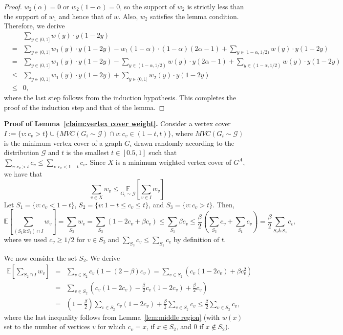 \documentclass[11pt]{article}
\newcommand{\E}[0]{\ensuremath{\mathbb{E}}}
\begin{document}
\begin{proof}
$w_2(\alpha) = 0$ or $w_2(1 - \alpha) = 0$, so the support of $w_2$ is
strictly less than the support of $w_1$ and hence that of $w$.
Also, $w_2$ satisfies the lemma condition.  Therefore,
we derive
\begin{eqnarray*}    
 & &  \sum_{y \in (0,1]} w(y) \cdot y (1 - 2y)\\
 & = & \sum_{y \in (0,1]} w_1(y) \cdot y (1 - 2y) -
  w_1(1-\alpha) \cdot (1 - \alpha) (2\alpha -1) + 
  \sum_{y \in [1-\alpha,1/2)} w(y) \cdot y (1 - 2y)\\ 
  & = & \sum_{y \in (0,1]} w_1(y) \cdot y (1 - 2y) -
  \sum_{y \in (1-\alpha,1/2)} w(y) \cdot y (2\alpha -1) + 
  \sum_{y \in (1-\alpha,1/2)} w(y) \cdot y (1 - 2y)\\ 
  & \le & \sum_{y \in (0,1]} w_1(y) \cdot y (1 - 2y)
   + \sum_{y \in (0,1]} w_2(y) \cdot y (1 - 2y)\\
   & \le & 0,
\end{eqnarray*}
where the last step follows from the induction hypothesis.  This
completes the proof of the induction step and that of the lemma.
\end{proof} 

\noindent\textbf{Proof of Lemma~\ref{claim:vertex cover weight}.}
Consider a vertex cover $I := \{ v : c_v > t \} \cup \{MVC(G_i \sim \mathcal{G}) \cap v :
    c_v \in (1-t , t) \}$, where $MVC(G_i \sim \mathcal{G})$ is the
    minimum vertex cover of a graph $G_i$ drawn randomly according to the distribution
    $\mathcal{G}$ and $t$ is the smallest $t \in [0.5, 1]$ such that
    $\sum_{v : c_v > t} c_v \leq \sum_{v: c_v < 1-t} c_v.$
    Since $X$ is a minimum weighted vertex cover of $G^A$, we have that 
    \[\sum_{v \in X} w_v \leq \underset{G_i \sim \mathcal{G}}{\E}[\sum_{v \in I} w_v]\]
    Let $S_1 = \{v: c_v < 1-t\}$, $S_2 = \{v: 1-t \le c_v \le t\}$, and $S_3 = \{v: c_v > t\}$.  Then,
\[\E \left[\sum_{(S_1 \& S_3) \cap I} w_v\right] = \sum_{S_3} w_v = \sum_{S_3} (1 - 2c_v + \beta c_v) \leq \sum_{S_3} \beta c_v \leq \frac{\beta}{2} \left(\sum_{S_3} c_v + \sum_{S_1} c_v\right) = \frac{\beta}{2} \sum_{S_1 \& S_3} c_v,\]
    where we used $c_v \ge 1/2$ for $v \in S_3$ and $\sum_{S_3} c_v \leq \sum_{S_1} c_v$ by definition of $t$.


    We now consider the set $S_2$.  We derive
    \begin{eqnarray*}
      \E \left[\sum_{S_2 \cap I} w_v\right] & = & \sum_{v \in S_2} c_v(1 - (2-\beta)c_v) = \sum_{v \in S_2} \left(c_v(1 - 2c_v) + \beta c_v^2\right)\\
      & = & \sum_{v \in S_2} \left(c_v(1 - 2c_v) - \frac{\beta}{2} c_v(1-2c_v) + \frac{\beta}{2} c_v\right)\\
      & = & \left(1 - \frac{\beta}{2}\right) \sum_{v \in S_2} c_v(1 - 2c_v) + \frac{\beta}{2} \sum_{v \in S_2} c_v
      \le \frac{\beta}{2} \sum_{v \in S_2} c_v,
    \end{eqnarray*}
    where the last inequality follows from Lemma~\ref{lem:middle
      region} (with $w(x)$ set to the number of vertices $v$ for which
    $c_v = x$, if $x \in S_2$, and 0 if $x \notin S_2$).
\end{document}
